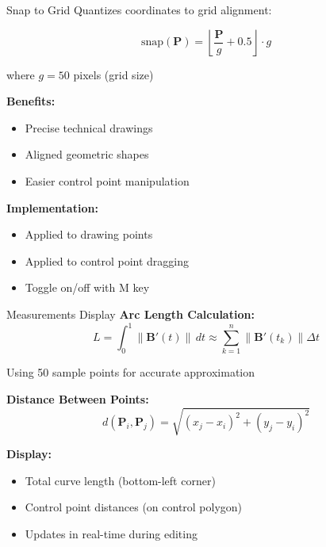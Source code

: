 \documentclass{beamer}
\begin{document}
\begin{frame}{Snap to Grid}
Quantizes coordinates to grid alignment:

\begin{equation*}
\text{snap}(\mathbf{P}) = \left\lfloor \frac{\mathbf{P}}{g} + 0.5 \right\rfloor \cdot g
\end{equation*}

where $g = 50$ pixels (grid size)

\vspace{1em}

\textbf{Benefits:}
\begin{itemize}
    \item Precise technical drawings
    \item Aligned geometric shapes
    \item Easier control point manipulation
\end{itemize}

\textbf{Implementation:}
\begin{itemize}
    \item Applied to drawing points
    \item Applied to control point dragging
    \item Toggle on/off with M key
\end{itemize}
\end{frame}

\begin{frame}{Measurements Display}
\textbf{Arc Length Calculation:}
\begin{equation*}
L = \int_0^1 \|\mathbf{B}'(t)\| \, dt \approx \sum_{k=1}^{n} \|\mathbf{B}'(t_k)\| \Delta t
\end{equation*}

Using 50 sample points for accurate approximation

\vspace{1em}

\textbf{Distance Between Points:}
\begin{equation*}
d(\mathbf{P}_i, \mathbf{P}_j) = \sqrt{(x_j-x_i)^2 + (y_j-y_i)^2}
\end{equation*}

\vspace{1em}

\textbf{Display:}
\begin{itemize}
    \item Total curve length (bottom-left corner)
    \item Control point distances (on control polygon)
    \item Updates in real-time during editing
\end{itemize}
\end{frame}
\end{document}
